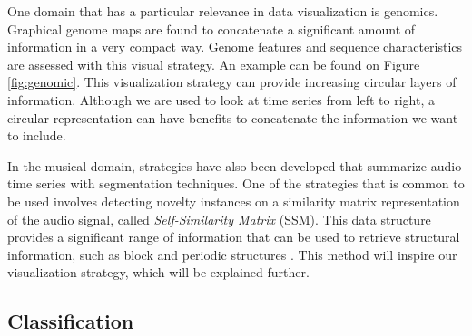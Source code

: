 One domain that has a particular relevance in data visualization is genomics. Graphical genome maps are found to concatenate a significant amount of information in a very compact way. Genome features and sequence characteristics are assessed with this visual strategy. An example can be found on Figure \ref{fig:genomic}. This visualization strategy can provide increasing circular layers of information. Although we are used to look at time series from left to right, a circular representation can have benefits to concatenate the information we want to include.
\par
In the musical domain, strategies have also been developed that summarize audio time series with segmentation techniques. One of the strategies that is common to be used involves detecting novelty instances on a similarity matrix representation of the audio signal, called \textit{Self-Similarity Matrix} (SSM). This data structure provides a significant range of information that can be used to retrieve structural information, such as block and periodic structures \cite{fmp1, fmp2, audiolabs1, audiolabs2}. This method will inspire our visualization strategy, which will be explained further.


\subsection{Classification}

